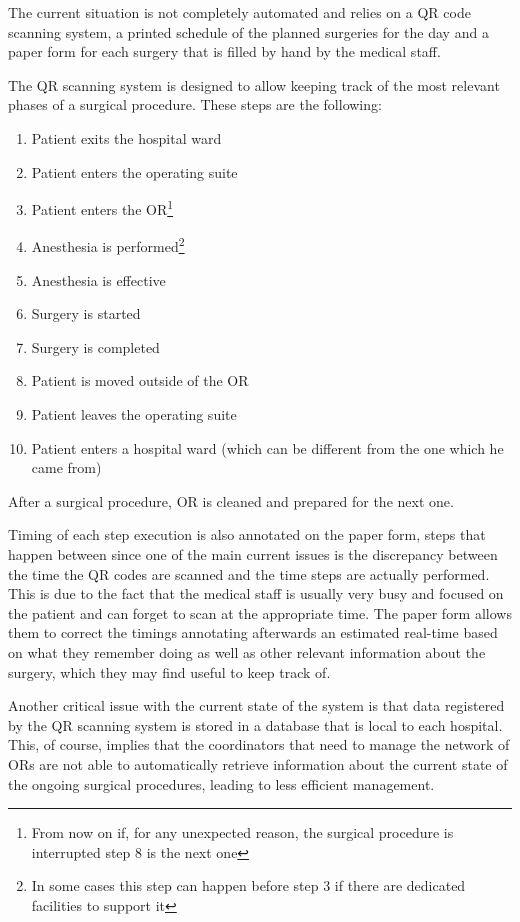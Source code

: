 The current situation is not completely automated and relies on a QR code scanning system, a printed schedule of the planned surgeries for the day and a paper form for each surgery that is filled by hand by the medical staff.

The QR scanning system is designed to allow keeping track of the most relevant phases of a surgical procedure. These steps are the following:
\begin{enumerate}
    \item Patient exits the hospital ward
    \item Patient enters the operating suite
    \item Patient enters the OR\footnote{From now on if, for any unexpected reason, the surgical procedure is interrupted step 8 is the next one}  %
    \item Anesthesia is performed\footnote{In some cases this step can happen before step 3 if there are dedicated facilities to support it}
    \item Anesthesia is effective
    \item Surgery is started
    \item Surgery is completed
    \item Patient is moved outside of the OR
    \item Patient leaves the operating suite
    \item Patient enters a hospital ward (which can be different from the one which he came from)
\end{enumerate}
%
After a surgical procedure, OR is cleaned and prepared for the next one. 

Timing of each step execution is also annotated on the paper form, steps that happen between since one of the main current issues is the discrepancy between the time the QR codes are scanned and the time steps are actually performed. This is due to the fact that the medical staff is usually very busy and focused on the patient and can forget to scan at the appropriate time. The paper form allows them to correct the timings annotating afterwards an estimated real-time based on what they remember doing as well as other relevant information about the surgery, which they may find useful to keep track of.

Another critical issue with the current state of the system is that data registered by the QR scanning system is stored in a database that is local to each hospital. This, of course, implies that the coordinators that need to manage the network of ORs are not able to automatically retrieve information about the current state of the ongoing surgical procedures, leading to less efficient management.

